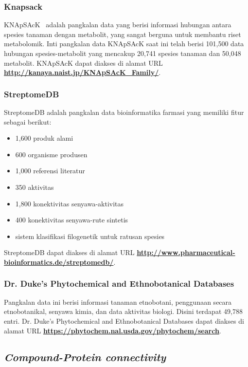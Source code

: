 		\subsubsection{Knapsack} \label{knapsack}
		KNApSAcK~\cite{pmid23292603,} adalah pangkalan data yang berisi informasi hubungan antara spesies tanaman dengan metabolit, yang sangat berguna untuk membantu riset metabolomik. Inti pangkalan data KNApSAcK saat ini telah berisi 101,500 data hubungan spesies-metabolit yang mencakup 20,741 spesies tanaman dan 50,048 metabolit. KNApSAcK dapat diakses di alamat URL \textbf{\url{http://kanaya.naist.jp/KNApSAcK_Family/}}.

		\subsubsection{StreptomeDB} \label{streptome_db}
		StreptomeDB adalah pangkalan data bioinformatika farmasi yang memiliki fitur sebagai berikut:
		\begin{itemize}
		\item 1,600 produk alami
		\item 600 organisme produsen
		\item 1,000 referensi literatur
		\item 350 aktivitas
		\item 1,800 konektivitas senyawa-aktivitas
		\item 400 konektivitas senyawa-rute sintetis 
		\item sistem klasifikasi filogenetik untuk ratusan spesies
		\end{itemize}
		StreptomeDB dapat diakses di alamat URL \textbf{\url{http://www.pharmaceutical-bioinformatics.de/streptomedb/}}.

		\subsubsection{Dr. Duke's Phytochemical and Ethnobotanical Databases} \label{pedb}
		Pangkalan data ini berisi informasi tanaman etnobotani, penggunaan secara etnobotanikal, senyawa kimia, dan data aktivitas biologi. Disini terdapat 49,788 entri. Dr. Duke's Phytochemical and Ethnobotanical Databases dapat diakses di alamat URL \textbf{\url{https://phytochem.nal.usda.gov/phytochem/search}}.

	\subsection{\emph{Compound-Protein connectivity}}
